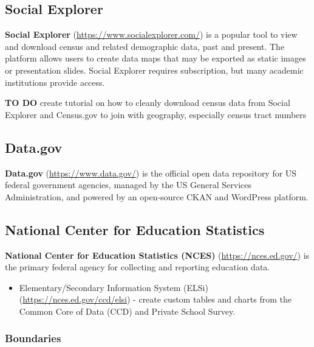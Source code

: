 \documentclass[
  english,
]{book}
\providecommand{\tightlist}{%
  \setlength{\itemsep}{0pt}\setlength{\parskip}{0pt}}
\begin{document}
\hypertarget{social-explorer}{%
\subsection{Social Explorer}\label{social-explorer}}

\textbf{Social Explorer} (\url{https://www.socialexplorer.com/}) is a popular tool to view and download census and related demographic data, past and present. The platform allows users to create data maps that may be exported as static images or presentation slides. Social Explorer requires subscription, but many academic institutions provide access.

\textbf{TO DO} create tutorial on how to cleanly download census data from Social Explorer and Census.gov to join with geography, especially census tract numbers

\hypertarget{data.gov}{%
\subsection{Data.gov}\label{data.gov}}

\textbf{Data.gov} (\url{https://www.data.gov/}) is the official open data repository for US federal government agencies, managed by the US General Services Administration, and powered by an open-source CKAN and WordPress platform.

\hypertarget{national-center-for-education-statistics}{%
\subsection{National Center for Education Statistics}\label{national-center-for-education-statistics}}

\textbf{National Center for Education Statistics (NCES)} (\url{https://nces.ed.gov/}) is the primary federal agency for collecting and reporting education data.

\begin{itemize}
\tightlist
\item
  Elementary/Secondary Information System (ELSi) (\url{https://nces.ed.gov/ccd/elsi}) - create custom tables and charts from the Common Core of Data (CCD) and Private School Survey.
\end{itemize}

\hypertarget{boundaries}{%
\subsubsection*{Boundaries}\label{boundaries}}
\end{document}
